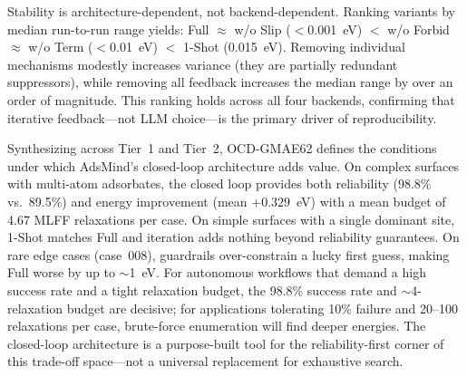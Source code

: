 Stability is architecture-dependent, not backend-dependent.
Ranking variants by median run-to-run range yields: Full $\approx$ w/o Slip ($<$0.001~eV) $<$ w/o Forbid $\approx$ w/o Term ($<$0.01~eV) $<$ 1-Shot (0.015~eV).
Removing individual mechanisms modestly increases variance (they are partially redundant suppressors), while removing all feedback increases the median range by over an order of magnitude.
This ranking holds across all four backends, confirming that iterative feedback---not LLM choice---is the primary driver of reproducibility.

Synthesizing across Tier~1 and Tier~2, OCD-GMAE62 defines the conditions under which AdsMind's closed-loop architecture adds value.
On complex surfaces with multi-atom adsorbates, the closed loop provides both reliability (98.8\% vs.\ 89.5\%) and energy improvement (mean $+0.329$~eV) with a mean budget of 4.67 MLFF relaxations per case.
On simple surfaces with a single dominant site, 1-Shot matches Full and iteration adds nothing beyond reliability guarantees.
On rare edge cases (case~008), guardrails over-constrain a lucky first guess, making Full worse by up to $\sim$1~eV.
For autonomous workflows that demand a high success rate and a tight relaxation budget, the 98.8\% success rate and $\sim$4-relaxation budget are decisive; for applications tolerating 10\% failure and 20--100 relaxations per case, brute-force enumeration will find deeper energies.
The closed-loop architecture is a purpose-built tool for the reliability-first corner of this trade-off space---not a universal replacement for exhaustive search.
